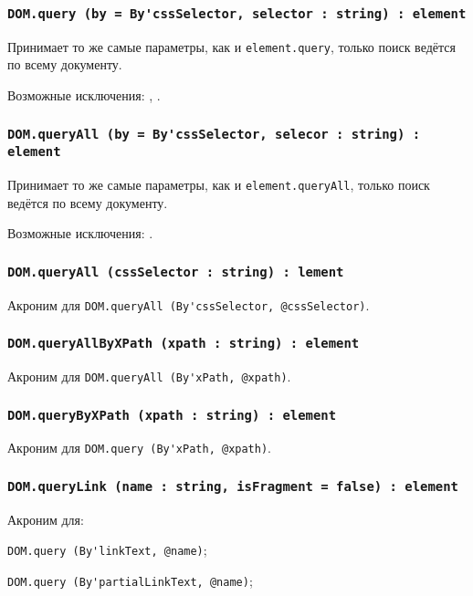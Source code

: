 \subsubsection{\lstinline|DOM.query (by = By'cssSelector, selector : string) : element|}

Принимает то же самые параметры, как и \lstinline|element.query|, только поиск ведётся по всему документу.

Возможные исключения: , .

\subsubsection{\lstinline|DOM.queryAll (by = By'cssSelector, selecor : string) : element|}

Принимает то же самые параметры, как и \lstinline|element.queryAll|, только поиск ведётся по всему документу. 

Возможные исключения: .

\subsubsection{\lstinline|DOM.queryAll (cssSelector : string) : lement|}

Акроним для \lstinline|DOM.queryAll (By'cssSelector, @cssSelector)|.

\subsubsection{\lstinline|DOM.queryAllByXPath (xpath : string) : element|}

Акроним для \lstinline|DOM.queryAll (By'xPath, @xpath)|.

\subsubsection{\lstinline|DOM.queryByXPath (xpath : string) : element|}

Акроним для \lstinline|DOM.query (By'xPath, @xpath)|.

\subsubsection{\lstinline|DOM.queryLink (name : string, isFragment = false) : element|}

Акроним для:
\begin{icItems}
	\item \lstinline|DOM.query (By'linkText, @name)|;
	\item \lstinline|DOM.query (By'partialLinkText, @name)|;
\end{icItems}


